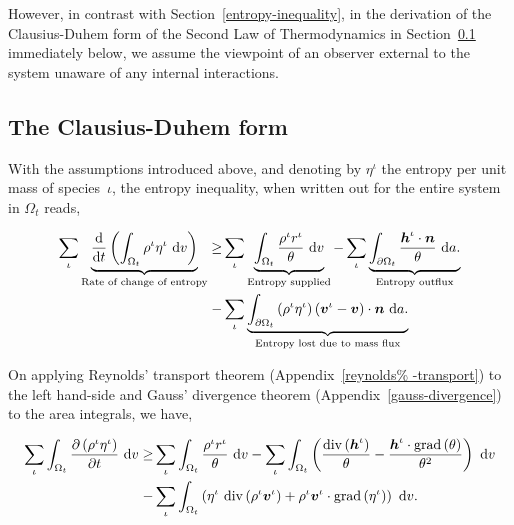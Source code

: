 \noindent However, in contrast with Section~\ref{entropy-inequality},
in the derivation of the Clausius-Duhem form of the Second Law of
Thermodynamics in Section~\ref{eu-clausius-duhem-form} immediately
below, we assume the viewpoint of an observer external to the system
unaware of any internal interactions.

\subsection{The Clausius-Duhem form}
\label{eu-clausius-duhem-form}

With the assumptions introduced above, and denoting by $\eta^\iota$
the entropy per unit mass of species~$\iota$, the entropy inequality,
when written out for the entire system in $\Omega_{t}$ reads,

\begin{equation}
\begin{split}
\sum\limits_{\iota}
\underbrace{\frac{\mathrm{d}}{\mathrm{d}t}\left(\int_{\Omega_{t}}
  \rho^{\iota} \eta^{\iota}\ \mathrm{d}v \right)}_{\text{Rate of
    change of entropy}} \geq & \sum\limits_{\iota}
\underbrace{\int_{\Omega_{t}} \frac{ \rho^{\iota}
    r^{\iota}}{\theta}\ \mathrm{d}v}_{\text{Entropy supplied}} -
\sum\limits_{\iota} \underbrace{\int_{\partial \Omega_{t}}
  \frac{\mbox{\boldmath$ h$}^{\iota}\cdot\mbox{\boldmath$ n$}}{\theta}\ \mathrm{d}a.}_{\text{Entropy
    outflux}} \\ - & \sum\limits_{\iota} \underbrace{\int_{\partial
    \Omega_{t}} \left(\rho^{\iota} \eta^{\iota} \right)
  \left(\mbox{\boldmath$ v$}^{\iota} - \mbox{\boldmath$ v$}\right) \cdot
  \mbox{\boldmath$ n$}\ \mathrm{d}a.}_{\text{Entropy lost due to mass flux}}
\end{split}
\label{eu-globalbalanceofentropy}
\end{equation}

On applying Reynolds' transport theorem (Appendix~\ref{reynolds%
  -transport}) to the left hand-side and Gauss' divergence theorem
(Appendix~\ref{gauss-divergence}) to the area integrals, we have,

\begin{equation*}
\begin{split}
\sum\limits_{\iota} \int_{\Omega_{t}} \frac{\partial
  \left(\rho^{\iota} \eta^{\iota}\right) }{\partial t} \ \mathrm{d}v
\geq & \sum\limits_{\iota} \int_{\Omega_{t}} \frac{ \rho^{\iota}
  r^{\iota}}{\theta}\ \mathrm{d}v - \sum\limits_{\iota}
\int_{\Omega_{t}} \left(
\frac{\mathrm{div}\left(\mbox{\boldmath$ h$}^{\iota}\right)}{\theta} -
\frac{\mbox{\boldmath$ h$}^{\iota}\cdot\mathrm{grad}\left(\theta\right)}{\theta^{2}}
\right)\ \mathrm{d}v \\ - & \sum\limits_{\iota} \int_{\Omega_{t}}
\left( \eta^{\iota}\ \mathrm{div} \left(\rho^{\iota}\mbox{\boldmath$ v$}^{\iota}
\right) +
\rho^{\iota}\mbox{\boldmath$ v$}^{\iota}\cdot\mathrm{grad}\left(\eta^{\iota}\right)
\right)\ \mathrm{d}v.
\end{split}
\end{equation*}

